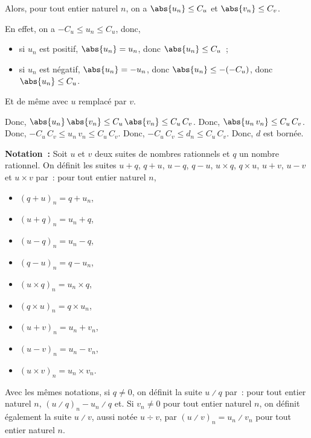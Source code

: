 \begin{itemize}[nosep]
            Alors, pour tout entier naturel $n$, on a $\abs{u_n} \leq C_u$ et $\abs{v_n} \leq C_v$.%
            \begin{foot}
                En effet, on a $-C_u \leq u_n \leq C_u$, donc,
                \begin{itemize}[nosep]
                    \item si $u_n$ est positif, $\abs{u_n} = u_n$, donc $\abs{u_n} \leq C_u$~;
                    \item si $u_n$ est négatif, $\abs{u_n} = -u_n$, donc $\abs{u_n} \leq -(-C_u)$, donc $\abs{u_n} \leq C_u$.
                \end{itemize}
                Et de même avec $u$ remplacé par $v$.
            \end{foot}
            Donc, $\abs{u_n} \, \abs{v_n} \leq C_u \, \abs{v_n} \leq C_u \, C_v$.
            Donc, $\abs{u_n \, v_n} \leq C_u \, C_v$.
            Donc, $-C_u \, C_v \leq u_n \, v_n \leq C_u \, C_v$.
            Donc, $-C_u \, C_v \leq d_n \leq C_u \, C_v$.
            Donc, $d$ est bornée.
    \end{itemize}

    \done

\medskip

\noindent\textbf{Notation :} Soit $u$ et $v$ deux suites de nombres rationnels et $q$ un nombre rationnel.
    On définit les suites $u + q$, $q + u$, $u - q$, $q - u$, $u \times q$, $q \times u$, $u + v$, $u - v$ et $u \times v$ par : pour tout entier naturel $n$, 
    \begin{itemize}[nosep]
        \item $(q + u)_n = q + u_n$,
        \item $(u + q)_n = u_n + q$,
        \item $(u - q)_n = u_n - q$,
        \item $(q - u)_n = q - u_n$,
        \item $(u \times q)_n = u_n \times q$,
        \item $(q \times u)_n = q \times u_n$,
        \item $(u + v)_n = u_n + v_n$,
        \item $(u - v)_n = u_n - v_n$,
        \item $(u \times v)_n = u_n \times v_n$. 
    \end{itemize}
    Avec les mêmes notations, si $q \neq 0$, on définit la suite $u \divslash q$ par : pour tout entier naturel $n$, $(u \divslash q)_n - u_n \divslash q$ et.
    Si $v_n \neq 0$ pour tout entier naturel $n$, on définit également la suite $u \divslash v$, aussi notée $u \div v$, par $\left( u \divslash v \right)_n = u_n \divslash v_n$ pour tout entier naturel $n$.

